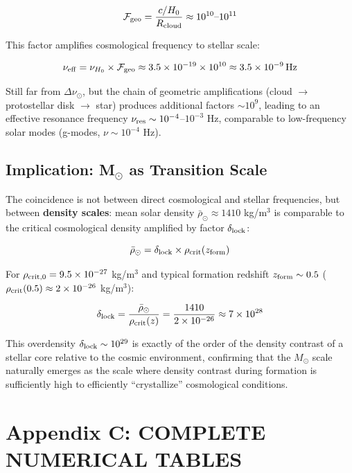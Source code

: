 \documentclass[11pt,a4paper]{article}
\begin{document}
\[\mathcal{F}_{\rm geo} = \frac{c/H_0}{R_{\rm cloud}} \approx 10^{10}\text{--}10^{11}\]

This factor amplifies cosmological frequency to stellar scale:

\[\nu_{\rm eff} = \nu_{H_0} \times \mathcal{F}_{\rm geo} \approx 3.5\times10^{-19} \times 10^{10} \approx 3.5\times10^{-9}\,\mathrm{Hz}\]

Still far from \(\Delta\nu_\odot\), but the chain of geometric
amplifications (cloud $\rightarrow$ protostellar disk $\rightarrow$ star) produces additional
factors \(\sim 10^9\), leading to an effective resonance frequency
\(\nu_{\rm res} \sim 10^{-4}\)--\(10^{-3}\) Hz, comparable to
low-frequency solar modes (g-modes, \(\nu \sim 10^{-4}\) Hz).

\hypertarget{b.3-implication-m-as-transition-scale}{%
\subsection*{Implication: M$_{\odot}$ as Transition
Scale}\label{b.3-implication-m-as-transition-scale}}

The coincidence is not between direct cosmological and stellar
frequencies, but between \textbf{density scales}: mean solar density
\(\bar\rho_\odot \approx 1410\) kg/m$^{3}$ is comparable to the critical
cosmological density amplified by factor \(\delta_{\rm lock}\):

\[\bar\rho_\odot = \delta_{\rm lock} \times \rho_{\rm crit}(z_{\rm form})\]

For \(\rho_{\rm crit,0} = 9.5\times10^{-27}\) kg/m$^{3}$ and typical
formation redshift \(z_{\rm form} \sim 0.5\)
(\(\rho_{\rm crit}(0.5) \approx 2\times10^{-26}\) kg/m$^{3}$):

\[\delta_{\rm lock} = \frac{\bar\rho_\odot}{\rho_{\rm crit}(z)} = \frac{1410}{2\times10^{-26}} \approx 7\times10^{28}\]

This overdensity \(\delta_{\rm lock} \sim 10^{29}\) is exactly of the
order of the density contrast of a stellar core relative to the cosmic
environment, confirming that the \(M_\odot\) scale naturally emerges as
the scale where density contrast during formation is sufficiently high
to efficiently ``crystallize'' cosmological conditions.

\hypertarget{appendix-c-complete-numerical-tables}{%
\section*{Appendix C: COMPLETE NUMERICAL
TABLES}\label{appendix-c-complete-numerical-tables}}
\end{document}
